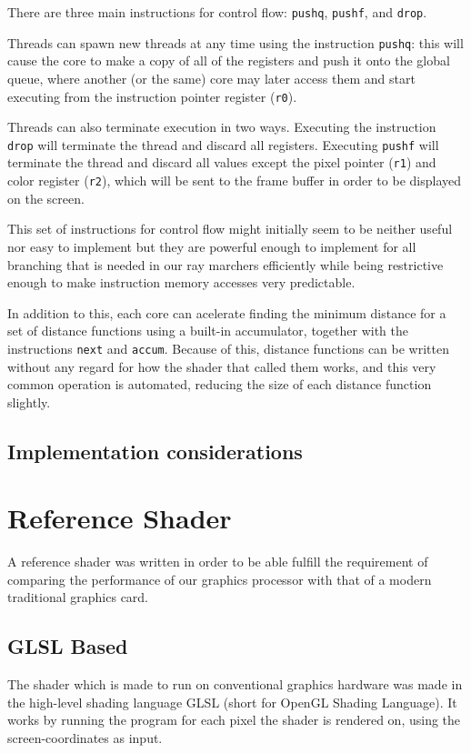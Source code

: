 			There are three main instructions for control flow: \texttt{pushq},
			\texttt{pushf}, and \texttt{drop}. 
			
			Threads can spawn new threads at any time using the instruction
			\texttt{pushq}: this will cause the core to make a copy of all of
			the registers and push it onto the global queue, where another (or
			the same) core may later access them and start executing from the
			instruction pointer register (\texttt{r0}).
			
			Threads can also terminate execution in two ways. Executing the
			instruction \texttt{drop} will terminate the thread and discard all
			registers. Executing \texttt{pushf} will terminate the thread and
			discard all values except the pixel pointer (\texttt{r1}) and color
			register (\texttt{r2}), which will be sent to the frame buffer in
			order to be displayed on the screen.
	
			This set of instructions for control flow might initially seem to
			be neither useful nor easy to implement but they are powerful
			enough to implement for all branching that is needed in our ray
			marchers efficiently while being restrictive enough to make
			instruction memory accesses very predictable.

			In addition to this, each core can acelerate finding the minimum 
			distance for a set of distance functions using a built-in 
			accumulator, together with the instructions \texttt{next} and 
			\texttt{accum}. Because of this, distance functions can be written
			without any regard for how the shader that called them works, and
			this very common operation is automated, reducing the size of each
			distance function slightly.
		
		\subsection{Implementation considerations}
	
	\section{Reference Shader} \label{implshader}
		
		A reference shader was written in order to be able fulfill the
		requirement of comparing the performance of our graphics processor with
		that of a modern traditional graphics card. 
	
		\subsection{GLSL Based}
			The shader which is made to run on conventional graphics hardware
			was made in the high-level shading language GLSL (short for 
			OpenGL Shading Language). It works by running the program for
			each pixel the shader is rendered on, using the screen-coordinates 
			as input.

